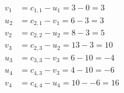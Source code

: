 \[
\begin{aligned}
v_{1} &= c_{1,1} - u_{1} = 3 - 0 = 3 \\
u_{2} &= c_{2,1} - v_{1} = 6 - 3 = 3 \\
v_{2} &= c_{2,2} - u_{2} = 8 - 3 = 5 \\
v_{3} &= c_{2,3} - u_{2} = 13 - 3 = 10 \\
u_{3} &= c_{3,3} - v_{3} = 6 - 10 = -4 \\
u_{4} &= c_{4,3} - v_{3} = 4 - 10 = -6 \\
v_{4} &= c_{4,4} - u_{4} = 10 - -6 = 16 \\
\end{aligned}
\]

